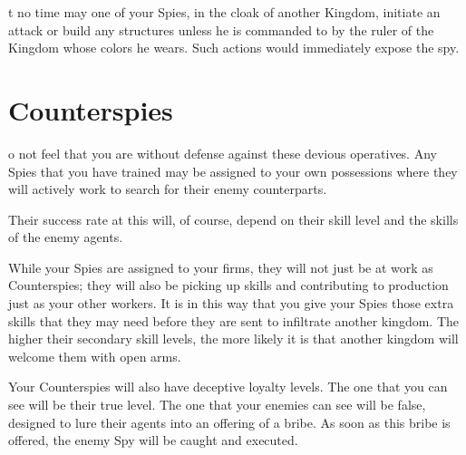
t no time may one of your Spies, in the cloak of another Kingdom, initiate an attack or build any structures unless he is commanded to by the ruler of the Kingdom whose colors he wears. Such actions would immediately expose the spy.

\section{\textsf{Counterspies}}


o not feel that you are without defense against these devious operatives. Any Spies that you have trained may be assigned to your own possessions where they will actively work to search for their enemy counterparts.

Their success rate at this will, of course, depend on their skill level and the skills of the enemy agents.

While your Spies are assigned to your firms, they will not just be at work as Counterspies; they will also be picking up skills and contributing to production just as your other workers. It is in this way that you give your Spies those extra skills that they may need before they are sent to infiltrate another kingdom. The higher their secondary skill levels, the more likely it is that another kingdom will welcome them with open arms.

Your Counterspies will also have deceptive loyalty levels. The one that you can see will be their true level. The one that your enemies can see will be false, designed to lure their agents into an offering of a bribe. As soon as this bribe is offered, the enemy Spy will be caught and executed.